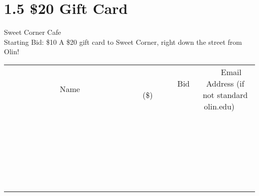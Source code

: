 \documentclass[11pt]{article}
\begin{document}
\section*{1.5 \$20 Gift Card}
Sweet Corner Cafe
\\
Starting Bid: \$10
\newline
A \$20 gift card to Sweet Corner, right down the street from Olin!
\\[6ex]
\begin{tabular}{c c c}
~~~~~~~~~~~~~Name~~~~~~~~~~~~~ & ~~~~~~~~~Bid (\$)~~~~~~~~~  & ~~~Email Address (if not standard olin.edu)~~~\\
 & & \\
\hline
 & & \\
\hline
 & & \\
\hline
 & & \\
\hline
 & & \\
\hline
 & & \\
\hline
 & & \\
\hline
 & & \\
\hline
 & & \\
\hline
 & & \\
\hline
 & & \\
\hline
 & & \\
\hline
 & & \\
\hline
 & & \\
\hline
 & & \\
\hline
 & & \\
\hline
 & & \\
\hline
 & & \\
\hline
 & & \\
\hline
 & & \\
\hline
 & & \\
\hline
 & & \\
\hline
 & & \\
\hline
 & & \\
\hline
 & & \\
\hline
 & & \\
\hline
\end{tabular}
\newpage
\end{document}
